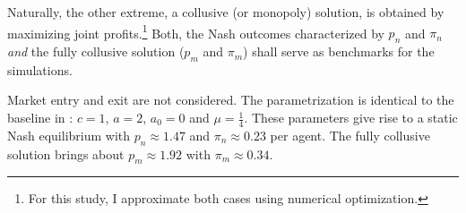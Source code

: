 Naturally, the other extreme, a collusive (or monopoly) solution, is obtained by maximizing joint profits.\footnote{For this study, I approximate both cases using numerical optimization.} Both, the Nash outcomes characterized by $p_n$ and $\pi_n$ \emph{and} the fully collusive solution ($p_m$ and $\pi_m$) shall serve as benchmarks for the simulations.

Market entry and exit are not considered. The parametrization is identical to the baseline in \textcite{calvano_artificial_2020}:
$c = 1$,
$a = 2$,
$a_0 = 0$ and
$\mu = \frac{1}{4}$. These parameters give rise to a static Nash equilibrium with $p_n \approx 1.47$ and $\pi_n \approx 0.23$ per agent. The fully collusive solution brings about $p_m \approx 1.92$ with $\pi_m \approx 0.34$.